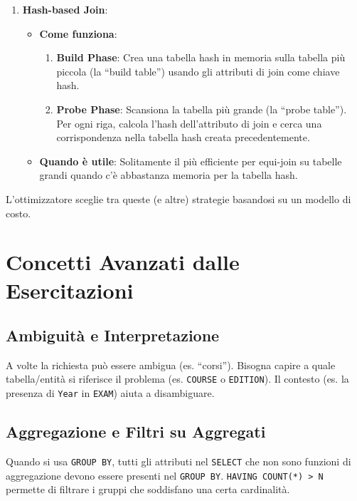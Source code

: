 \begin{enumerate}
    \item \textbf{Hash-based Join}:
    \begin{itemize}
        \item \textbf{Come funziona}:
        \begin{enumerate}
            \item \textbf{Build Phase}: Crea una tabella hash in memoria sulla tabella più piccola (la ``build table'') usando gli attributi di join come chiave hash.
            \item \textbf{Probe Phase}: Scansiona la tabella più grande (la ``probe table''). Per ogni riga, calcola l'hash dell'attributo di join e cerca una corrispondenza nella tabella hash creata precedentemente.
        \end{enumerate}
        \item \textbf{Quando è utile}: Solitamente il più efficiente per equi-join su tabelle grandi quando c'è abbastanza memoria per la tabella hash.
    \end{itemize}
\end{enumerate}
L'ottimizzatore sceglie tra queste (e altre) strategie basandosi su un modello di costo.\section{Concetti Avanzati dalle Esercitazioni}

\subsection{Ambiguità e Interpretazione}
A volte la richiesta può essere ambigua (es. ``corsi''). Bisogna capire a quale tabella/entità si riferisce il problema (es. \texttt{COURSE} o \texttt{EDITION}). Il contesto (es. la presenza di \texttt{Year} in \texttt{EXAM}) aiuta a disambiguare.

\subsection{Aggregazione e Filtri su Aggregati}
Quando si usa \texttt{GROUP BY}, tutti gli attributi nel \texttt{SELECT} che non sono funzioni di aggregazione devono essere presenti nel \texttt{GROUP BY}.
\texttt{HAVING COUNT(*) > N} permette di filtrare i gruppi che soddisfano una certa cardinalità.


